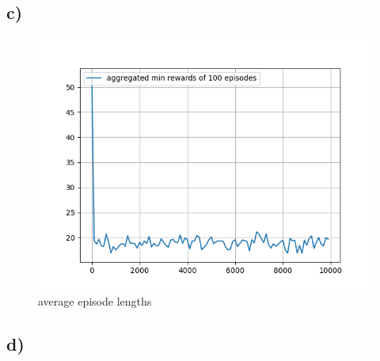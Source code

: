 \documentclass[a4paper]{article}
\begin{document}
\subsection*{c)}
\begin{figure}[!ht]
	\centering
	\includegraphics[width=0.7\linewidth]{length}
	\caption{average episode lengths}
	\label{fig:length}
\end{figure}

\subsection*{d)}
\end{document}
